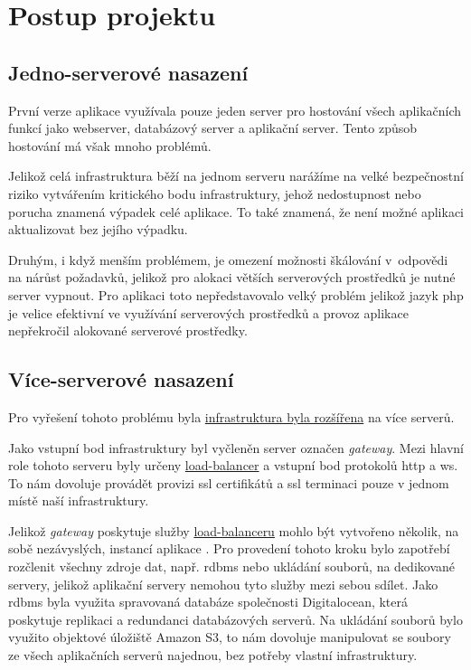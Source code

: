 
\section{Postup projektu}

\subsection{Jedno-serverové nasazení}

První verze aplikace \bso{} využívala pouze jeden server pro hostování všech aplikačních funkcí jako \acrshort{webserver}, databázový server a aplikační server. Tento způsob hostování má však mnoho problémů.

Jelikož celá infrastruktura běží na jednom serveru narážíme na velké bezpečnostní riziko vytvářením kritického bodu infrastruktury, jehož nedostupnost nebo porucha znamená výpadek celé aplikace. 
To také znamená, že není možné aplikaci aktualizovat bez jejího výpadku. 

Druhým, i když menším problémem, je omezení možnosti škálování v~odpovědi na nárůst požadavků, jelikož pro alokaci větších serverových prostředků je nutné server vypnout.
Pro aplikaci \bso{} toto nepředstavovalo velký problém jelikož jazyk \acrshort{php} je velice efektivní ve využívání serverových prostředků a provoz aplikace nepřekročil alokované serverové prostředky.

\subsection{Více-serverové nasazení}

Pro vyřešení tohoto problému byla \hyperref[fig:servery]{infrastruktura byla rozšířena} na více serverů. 

Jako vstupní bod infrastruktury byl vyčleněn server označen \textit{gateway}.
Mezi hlavní role tohoto serveru byly určeny \hyperref[sub:load-balancing]{load-balancer} a vstupní bod protokolů \acrshort{http} a \acrshort{ws}.
To nám dovoluje provádět provizi ssl certifikátů a ssl terminaci pouze v jednom místě naší infrastruktury.

Jelikož \textit{gateway} poskytuje služby \hyperref[sub:load-balancing]{load-balanceru} mohlo být vytvořeno několik, na sobě nezávyslých, instancí aplikace \bso{}.
Pro provedení tohoto kroku bylo zapotřebí rozčlenit všechny zdroje dat, např. \acrshort{rdbms} nebo ukládání souborů, na dedikované servery, jelikož aplikační servery nemohou tyto služby mezi sebou sdílet.
Jako \acrshort{rdbms} byla využita spravovaná databáze společnosti Digitalocean, která poskytuje replikaci a redundanci databázových serverů.
Na ukládání souborů bylo využito objektové úložiště Amazon S3, to nám dovoluje manipulovat se soubory ze všech aplikačních serverů najednou, bez potřeby vlastní infrastruktury.

